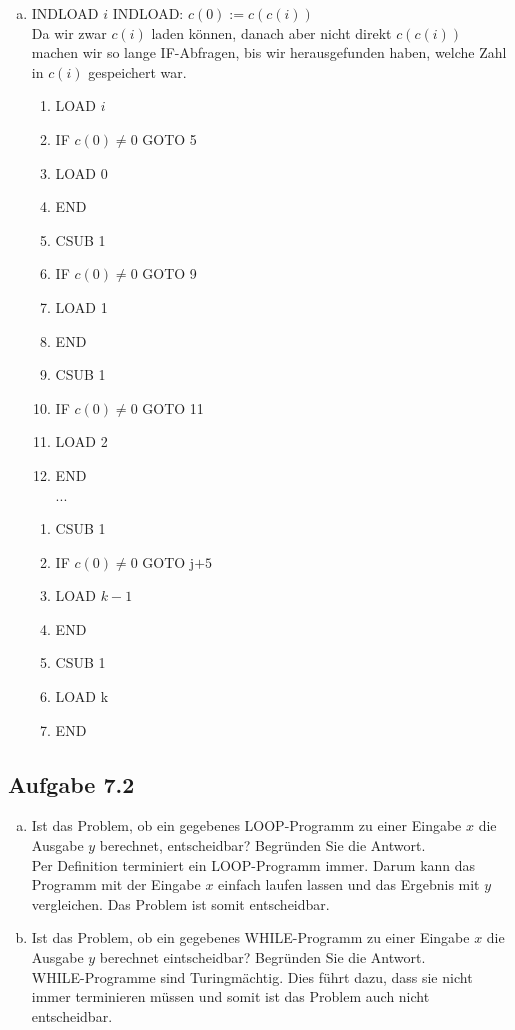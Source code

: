\begin{enumerate}[(a)]
	\item INDLOAD $i$
	INDLOAD: $c(0) := c(c(i))$\\
	Da wir zwar $c(i)$ laden können, danach aber nicht direkt $c(c(i))$ machen wir so lange IF-Abfragen, bis wir herausgefunden haben, welche Zahl in $c(i)$ gespeichert war.
	\begin{enumerate}[ 1.]
		\item LOAD $i$
		\item IF $c(0) \neq 0$ GOTO 5
		\item LOAD 0
		\item END
		\item CSUB 1
		\item IF $c(0) \neq 0$ GOTO 9
		\item LOAD 1
		\item END
		\item CSUB 1
		\item IF $c(0) \neq 0$ GOTO 11
		\item LOAD 2
		\item END\\
		...
	\end{enumerate}
	\begin{enumerate}[j+1]
		\item CSUB 1
		\item IF $c(0) \neq 0$ GOTO j$+5$
		\item LOAD $k-1$
		\item END
		\item CSUB 1
		\item LOAD k
		\item END
	\end{enumerate}
\end{enumerate}

\subsection*{Aufgabe 7.2}
\begin{enumerate}[(a)]
	\item Ist das Problem, ob ein gegebenes LOOP-Programm zu einer Eingabe $x$ die Ausgabe $y$ berechnet, entscheidbar? Begründen Sie die Antwort.\\
	Per Definition terminiert ein LOOP-Programm immer. Darum kann das Programm mit der Eingabe $x$ einfach laufen lassen und das Ergebnis mit $y$ vergleichen. Das Problem ist somit entscheidbar.
	\item Ist das Problem, ob ein gegebenes WHILE-Programm zu einer Eingabe $x$ die Ausgabe $y$ berechnet eintscheidbar? Begründen Sie die Antwort.\\
	WHILE-Programme sind Turingmächtig. Dies führt dazu, dass sie nicht immer terminieren müssen und somit ist
	das Problem auch nicht entscheidbar.
\end{enumerate}
